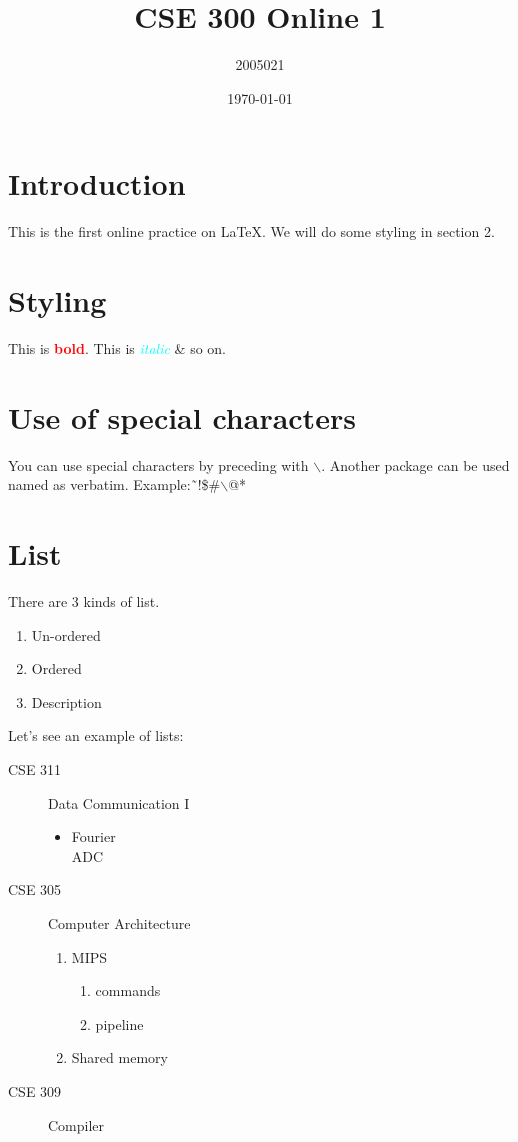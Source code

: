 \documentclass{article}
\title{CSE 300 Online 1}
\author{2005021}
\date{\today}
\begin{document}
\maketitle
\tableofcontents

\section{Introduction}
This is the first online practice on \LaTeX.
We will do some styling in section 2.

\section{Styling}
This is \textcolor{red}{\textbf{bold}}. This is \textit{\textcolor{cyan}{italic}} \& so on.

\section*{Use of special characters}
You can use special characters by preceding with $\backslash$. Another package can be
used named as verbatim. Example: \~\,!\$\#$\backslash$@*\,\^\\

\section{List}
There are 3 kinds of list.

\begin{enumerate}[i]
    \item Un-ordered
    \item Ordered
    \item Description 
\end{enumerate}
Let’s see an example of lists:
\begin{description}
    \item [CSE 311] Data Communication I
    \begin{itemize}
        \item Fourier\\
        ADC
    \end{itemize}
    \item [CSE 305]  Computer Architecture
    \begin{enumerate}
        \item MIPS
        \begin{enumerate}
            \item commands
            \item pipeline
        \end{enumerate}
        \item Shared memory
    \end{enumerate}
    \item [CSE 309]  Compiler
\end{description}
\end{document}
